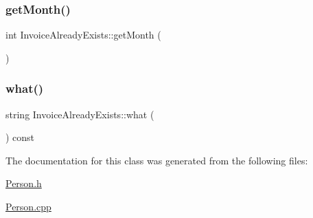 \subsubsection{\texorpdfstring{get\+Month()}{getMonth()}}
{\footnotesize\ttfamily int Invoice\+Already\+Exists\+::get\+Month (\begin{DoxyParamCaption}{ }\end{DoxyParamCaption})\hspace{0.3cm}{\ttfamily [inline]}}

\mbox{\label{class_invoice_already_exists_ae0239e7ba5445491a3182d77d34b1505}} 
\subsubsection{\texorpdfstring{what()}{what()}}
{\footnotesize\ttfamily string Invoice\+Already\+Exists\+::what (\begin{DoxyParamCaption}{ }\end{DoxyParamCaption}) const}



The documentation for this class was generated from the following files\+:\begin{DoxyCompactItemize}
\item 
\mbox{\hyperlink{_person_8h}{Person.\+h}}\item 
\mbox{\hyperlink{_person_8cpp}{Person.\+cpp}}\end{DoxyCompactItemize}
